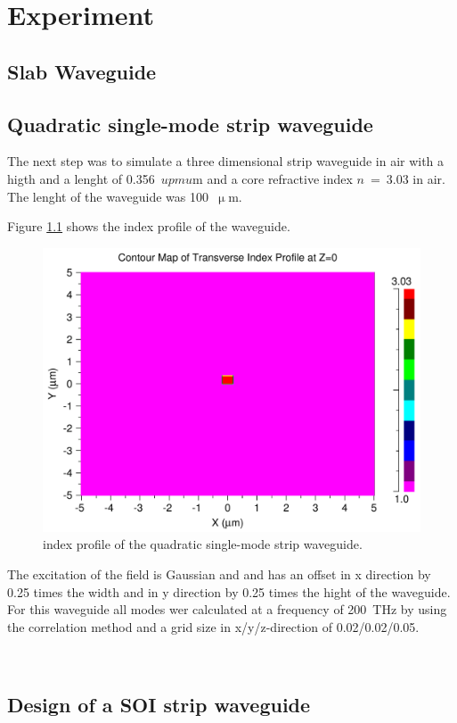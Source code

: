 \chapter{Experiment}
\section{Slab Waveguide}



\section{Quadratic single-mode strip waveguide}
The next step was to simulate a three dimensional strip waveguide in air with a higth and a lenght of 0.356~$upmu$m and a core refractive index $n$~=~3.03 in air.
The lenght of the waveguide was 100~$\upmu$m.

Figure \ref{fig:2_index} shows the index profile of the waveguide.

\begin{figure}%
\includegraphics[width=.5\columnwidth]{Grafiken/2_index}%
\caption{index profile of the quadratic single-mode strip waveguide.}%
\label{fig:2_index}%
\end{figure}

The excitation of the field is Gaussian and and has an offset in x direction by 0.25 times the width and in y direction by 0.25 times the hight of the waveguide.
For this waveguide all modes wer calculated at a frequency of 200~THz by using the correlation method and a grid size in x/y/z-direction of 0.02/0.02/0.05. 



\begin{figure}%
\centering
	\\%
\caption{}%
\label{fig:2_modes}%
\end{figure}




\section{Design of a SOI strip waveguide}